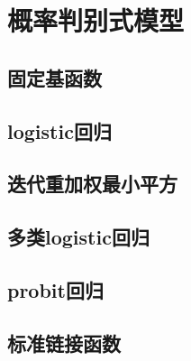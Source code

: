 \section{概率判别式模型}
\subsection*{固定基函数}
\subsection*{logistic回归}
\subsection*{迭代重加权最小平方}
\subsection*{多类logistic回归}
\subsection*{probit回归}
\subsection*{标准链接函数}